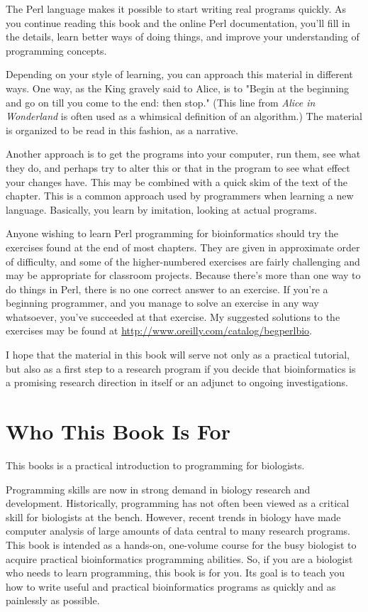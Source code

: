 The Perl language makes it possible to start writing real programs quickly. As you continue reading this book and the online Perl documentation, you'll fill in the details, learn better ways of doing things, and improve your understanding of programming concepts.

Depending on your style of learning, you can approach this material in different ways. One way, as the King gravely said to Alice, is to "Begin at the beginning and go on till you come to the end: then stop." (This line from \textit{Alice in Wonderland} is often used as a whimsical definition of an algorithm.) The material is organized to be read in this fashion, as a narrative.

Another approach is to get the programs into your computer, run them, see what they do, and perhaps try to alter this or that in the program to see what effect your changes have. This may be combined with a quick skim of the text of the chapter. This is a common approach used by programmers when learning a new language. Basically, you learn by imitation, looking at actual programs.

Anyone wishing to learn Perl programming for bioinformatics should try the exercises found at the end of most chapters. They are given in approximate order of difficulty, and some of the higher-numbered exercises are fairly challenging and may be appropriate for classroom projects. Because there's more than one way to do things in Perl, there is no one correct answer to an exercise. If you're a beginning programmer, and you manage to solve an exercise in any way whatsoever, you've succeeded at that exercise. My suggested solutions to the exercises may be found at \href{http://www.oreilly.com/catalog/begperlbio}{http://www.oreilly.com/catalog/begperlbio}.

I hope that the material in this book will serve not only as a practical tutorial, but also as a first step to a research program if you decide that bioinformatics is a promising research direction in itself or an adjunct to ongoing investigations. 

\section*{Who This Book Is For}
This books is a practical introduction to programming for biologists.

Programming skills are now in strong demand in biology research and development. Historically, programming has not often been viewed as a critical skill for biologists at the bench. However, recent trends in biology have made computer analysis of large amounts of data central to many research programs. This book is intended as a hands-on, one-volume course for the busy biologist to acquire practical bioinformatics programming abilities. So, if you are a biologist who needs to learn programming, this book is for you. Its goal is to teach you how to write useful and practical bioinformatics programs as quickly and as painlessly as possible.


